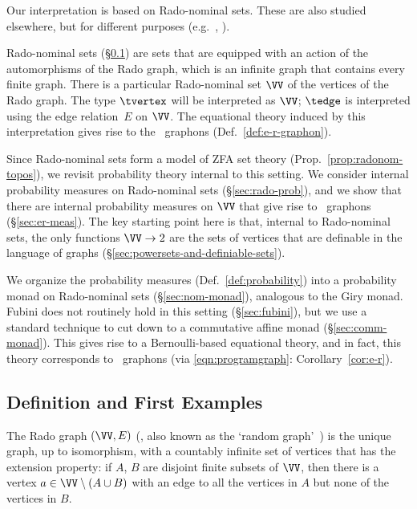 Our interpretation is based on Rado-nominal sets. These are also studied elsewhere, but for different purposes (e.g.~\cite{lmcs:1157,bojancyk-place,homomorphisms-fodef}, \cite[\S1.9]{pitts-nom-book}).

Rado-nominal sets (\S\ref{sec:rado-def}) are sets that are equipped with an action of the automorphisms of the Rado graph, which is an infinite graph that contains every finite graph.
There is a particular Rado-nominal set $\VV$ of the vertices of the Rado graph. The type $\tvertex$ will be interpreted as $\VV$;
$\tedge$ is interpreted using the edge relation~$E$ on $\VV$.
The equational theory induced by this interpretation gives rise to the \ErdosRenyi\ graphons (Def.~\ref{def:e-r-graphon}).

Since Rado-nominal sets form a model of ZFA set theory (Prop.~\ref{prop:radonom-topos}), we revisit
probability theory internal to this setting. We consider internal probability measures on Rado-nominal sets (\S\ref{sec:rado-prob}), and we show that there are internal probability measures on $\VV$ that give rise to \ErdosRenyi\ graphons (\S\ref{sec:er-meas}). The key starting point here is that, internal to Rado-nominal sets, the only functions $\VV\to 2$ are the sets of vertices that are definable in the language of graphs (\S\ref{sec:powersets-and-definiable-sets}). 

We organize the probability measures (Def.~\ref{def:probability}) into
a probability monad on Rado-nominal sets (\S\ref{sec:nom-monad}), analogous to the Giry monad. 
Fubini does not routinely hold in this setting (\S\ref{sec:fubini}), but we use a standard technique to cut down to a commutative affine monad (\S\ref{sec:comm-monad}). This gives rise to a Bernoulli-based equational theory, and in fact, this theory corresponds to \ErdosRenyi\ graphons (via \eqref{eqn:programgraph}: Corollary~\ref{cor:e-r}).

\subsection{Definition and First Examples}\label{sec:rado-def}
The Rado graph $(\VV,E)$ (\hspace{1sp}\cite{ackermannWiderspruchsfreiheitAllgemeinenMengenlehre1937,radoUniversalGraphsUniversal1964}, also known as the `random graph'~\cite{erdosRandomGraphs1959}) is the unique graph, up to isomorphism, with a countably infinite set of vertices
that has the extension property:
if $A$, $B$ are disjoint finite subsets of $\VV$, then there is a
vertex $a \in \VV \setminus (A \cup B)$ with an edge to all the vertices in $A$ but none of the
vertices in $B$.

